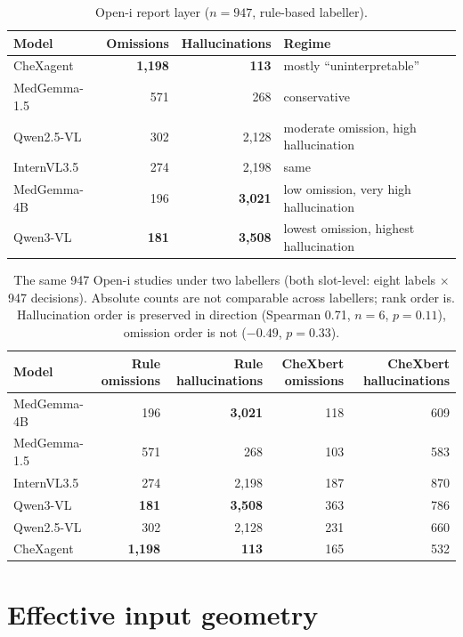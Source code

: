 \begin{table}[H]
\centering
\small
\caption{Open-i report layer ($n=947$, rule-based labeller).}
\label{tab:report}
\begin{tabular}{lrrl}
\toprule
Model & Omissions & Hallucinations & Regime \\
\midrule
CheXagent & \textbf{1,198} & \textbf{113} & mostly ``uninterpretable'' \\
MedGemma-1.5 & 571 & 268 & conservative \\
Qwen2.5-VL & 302 & 2,128 & moderate omission, high hallucination \\
InternVL3.5 & 274 & 2,198 & same \\
MedGemma-4B & 196 & \textbf{3,021} & low omission, very high hallucination \\
Qwen3-VL & \textbf{181} & \textbf{3,508} & lowest omission, highest hallucination \\
\bottomrule
\end{tabular}
\end{table}

\begin{table}[H]
\centering
\small
\caption{The same 947 Open-i studies under two labellers (both slot-level: eight labels $\times$ 947 decisions). Absolute counts are not comparable across labellers; rank order is. Hallucination order is preserved in direction (Spearman 0.71, $n=6$, $p=0.11$), omission order is not ($-0.49$, $p=0.33$).}
\label{tab:chexbert}
\begin{tabular}{lrrrr}
\toprule
Model & Rule omissions & Rule hallucinations & CheXbert omissions & CheXbert hallucinations \\
\midrule
MedGemma-4B & 196 & \textbf{3,021} & 118 & 609 \\
MedGemma-1.5 & 571 & 268 & 103 & 583 \\
InternVL3.5 & 274 & 2,198 & 187 & 870 \\
Qwen3-VL & \textbf{181} & \textbf{3,508} & 363 & 786 \\
Qwen2.5-VL & 302 & 2,128 & 231 & 660 \\
CheXagent & \textbf{1,198} & \textbf{113} & 165 & 532 \\
\bottomrule
\end{tabular}
\end{table}

\section{Effective input geometry}
\label{app:geometry}

